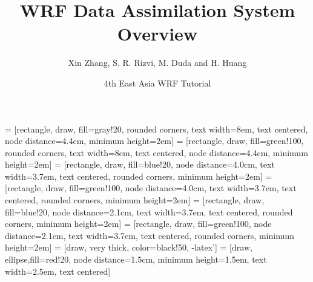 \documentclass{beamer}
\begin{document}
\title{WRF Data Assimilation System Overview}

\author[Xin Zhang et al.]{Xin Zhang, S. R. Rizvi, M. Duda and H. Huang}
\date{4th East Asia WRF Tutorial}

 = [rectangle, draw, fill=gray!20, rounded corners,
    text width=8em, text centered, node distance=4.4cm, minimum height=2em]
 = [rectangle, draw, fill=green!100, rounded corners,
    text width=8em, text centered, node distance=4.4cm, minimum height=2em]
 = [rectangle, draw, fill=blue!20, node distance=4.0cm, 
    text width=3.7em, text centered, rounded corners, minimum height=2em]
 = [rectangle, draw, fill=green!100, node distance=4.0cm, 
    text width=3.7em, text centered, rounded corners, minimum height=2em]
 = [rectangle, draw, fill=blue!20, node distance=2.1cm, 
    text width=3.7em, text centered, rounded corners, minimum height=2em]
 = [rectangle, draw, fill=green!100, node distance=2.1cm, 
    text width=3.7em, text centered, rounded corners, minimum height=2em]
 = [draw, very thick, color=black!50, -latex']
 = [draw, ellipse,fill=red!20, node distance=1.5cm,
    minimum height=1.5em, text width=2.5em, text centered]
\end{document}
